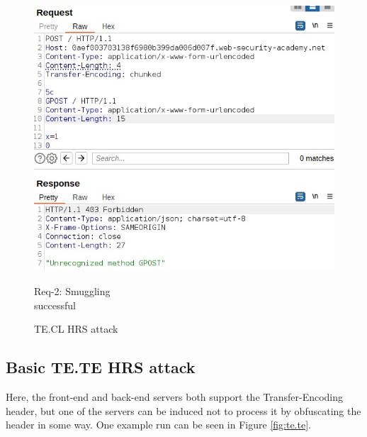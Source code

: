 \documentclass[conference]{IEEEtran}
\begin{document}
\begin{figure}[htbp]
\begin{minipage}[c]{0.45\linewidth}
	  \includegraphics[width=\linewidth]{results/TE.CL_req2_GPOST_invalid.jpeg}
	  \captionsetup{justification=centering}
	  \caption*{Req-2: Smuggling \\ successful}
	  \label{fig:te.cl_req2_gpost}
	\end{minipage}
  
	\caption{TE.CL HRS attack}
	\label{fig:te.cl}
\end{figure}

\subsection*{Basic TE.TE HRS attack}
Here, the front-end and back-end servers both support the Transfer-Encoding header, but one of the servers can be induced not to process it by obfuscating the header in some way. One example run can be seen in Figure \ref*{fig:te.te}.
\end{document}
